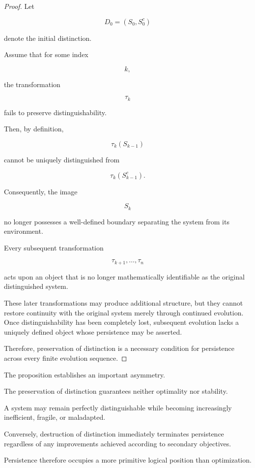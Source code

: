 \documentclass[11pt]{book}
\numberwithin{equation}{chapter}
\theoremstyle{definition}
\theoremstyle{plain}
\begin{document}
\begin{proof}

Let

\[
D_0=(S_0,S_0^{c})
\]

denote the initial distinction.

Assume that for some index

\[
k,
\]

the transformation

\[
\tau_k
\]

fails to preserve distinguishability.

Then, by definition,

\[
\tau_k(S_{k-1})
\]

cannot be uniquely distinguished from

\[
\tau_k(S_{k-1}^{c}).
\]

Consequently, the image

\[
S_k
\]

no longer possesses a well-defined boundary separating the system from its environment.

Every subsequent transformation

\[
\tau_{k+1},\ldots,\tau_n
\]

acts upon an object that is no longer mathematically identifiable as the original distinguished system.

These later transformations may produce additional structure, but they cannot restore continuity with the original system merely through continued evolution. Once distinguishability has been completely lost, subsequent evolution lacks a uniquely defined object whose persistence may be asserted.

Therefore, preservation of distinction is a necessary condition for persistence across every finite evolution sequence.

\end{proof}

The proposition establishes an important asymmetry.

The preservation of distinction guarantees neither optimality nor stability.

A system may remain perfectly distinguishable while becoming increasingly inefficient, fragile, or maladapted.

Conversely, destruction of distinction immediately terminates persistence regardless of any improvements achieved according to secondary objectives.

Persistence therefore occupies a more primitive logical position than optimization.
\end{document}
